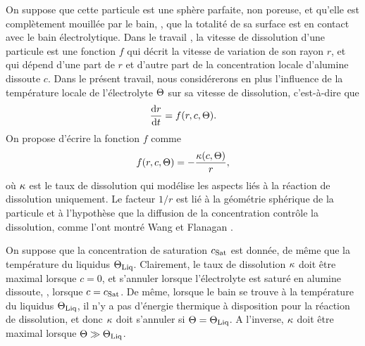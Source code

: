 On suppose que cette particule est une sphère parfaite, non poreuse,
et qu'elle est complètement mouillée par le bain, \ie, que la totalité
de sa surface est en contact avec le bain électrolytique. Dans le travail
\cite{Hofer2011}, la vitesse de dissolution d'une particule est une
fonction $f$ qui décrit la vitesse de variation de son rayon $r$, et
qui dépend d'une part de $r$ et d'autre part de la concentration
locale d'alumine dissoute $c$. Dans le présent travail, nous
considérerons en plus l'influence de la température locale de
l'électrolyte $\Theta$ sur sa vitesse de dissolution,
c'est-à-dire que
\begin{equation}\label{eq:radius-edo}
  \frac{\mathrm dr}{\mathrm dt} = f(r, c, \Theta).
\end{equation}
On propose d'écrire la fonction $f$ comme
\begin{equation}\label{eq:dissolution-velocity}
  f(r, c, \Theta) = -\frac{\kappa(c, \Theta)}{r},
\end{equation}
où $\kappa$ est le taux de dissolution qui modélise les
aspects liés à la réaction de dissolution uniquement. Le facteur $1/r$
est lié à la géométrie sphérique de la particule et à l'hypothèse que
la diffusion de la concentration contrôle la dissolution, comme l'ont
montré Wang et Flanagan \cite{Wang1999}.

On suppose que la concentration de saturation $c_\text{Sat}$ est donnée, de
même que la température du liquidus $\Theta_\text{Liq}$. Clairement, le taux de
dissolution $\kappa$ doit être maximal lorsque $c = 0$, et
s'annuler lorsque l'électrolyte est saturé en alumine dissoute, \ie, lorsque $c
= c_\text{Sat}$. De même, lorsque le bain se trouve à la température du
liquidus $\Theta_\text{Liq}$, il n'y a pas d'énergie thermique à disposition pour
la réaction de dissolution, et donc $\kappa$ doit s'annuler
si $\Theta = \Theta_\text{Liq}$. A l'inverse, $\kappa$ doit être
maximal lorsque $\Theta\gg\Theta_\text{Liq}$.

